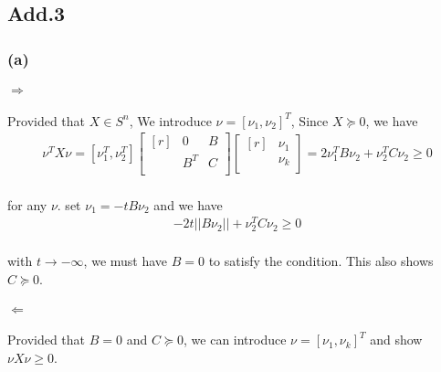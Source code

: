 \subsection*{Add.3}
\subsubsection*{(a)}
\paragraph{}
$\Rightarrow$
\paragraph{}
Provided that $X \in S^n$, We introduce $\nu = [\nu_1, \nu_2]^T$, Since $X \succeq 0$, we have
\begin{align*}
\nu^T X\nu =[\nu_1^T, \nu_2^T]\begin{bmatrix*}[r]
& 0 & B\\&B^T &C\\
\end{bmatrix*}\begin{bmatrix*}[r]
&\nu_1 \\&\nu_k\\ 
\end{bmatrix*}= 2\nu_1^TB\nu_2 +\nu_2^TC\nu_2 \geq 0
\end{align*}
\paragraph{}
for any $\nu$. set $\nu_1 =-tB\nu_2$ and we have
\begin{align*}
-2t||B\nu_2|| + \nu_2^TC\nu_2 \geq 0
\end{align*} 
\paragraph{}
with $ t \rightarrow -\infty$, we must have $B = 0$ to satisfy the condition. This also shows $ C \succeq 0$.
\paragraph{}
$\Leftarrow$
\paragraph{}
Provided that $B =0$ and $C \succeq 0$, we can introduce $\nu = [\nu_1, \nu_k]^T$ and show $\nu X\nu \geq 0$.
